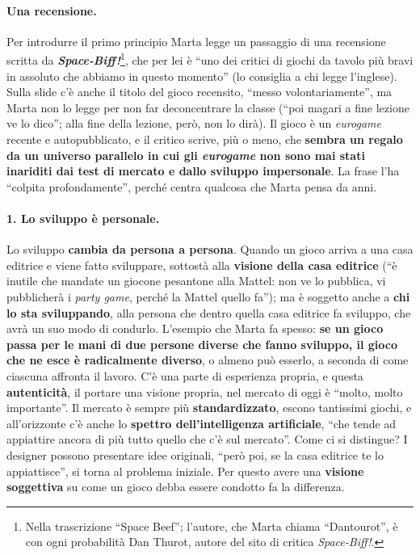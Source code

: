 

\paragraph{Una recensione.} Per introdurre il primo principio Marta legge un passaggio
di una recensione scritta da \textbf{\emph{Space-Biff!}}\footnote{Nella trascrizione
``Space Beef''; l'autore, che Marta chiama ``Dantourot'', è con ogni probabilità Dan
Thurot, autore del sito di critica \emph{Space-Biff!}.}, che per lei è ``uno dei critici
di giochi da tavolo più bravi in assoluto che abbiamo in questo momento'' (lo consiglia a
chi legge l'inglese). Sulla slide c'è anche il titolo del gioco recensito, ``messo
volontariamente'', ma Marta non lo legge per non far deconcentrare la classe (``poi
magari a fine lezione ve lo dico''; alla fine della lezione, però, non lo dirà). Il
gioco è un \emph{eurogame} recente e autopubblicato, e il critico scrive, più o meno,
che \textbf{sembra un regalo da un universo parallelo in cui gli \emph{eurogame} non sono
mai stati inariditi dai test di mercato e dallo sviluppo impersonale}. La frase l'ha
``colpita profondamente'', perché centra qualcosa che Marta pensa da anni.

\paragraph{1. Lo sviluppo è personale.} Lo sviluppo \textbf{cambia da persona a persona}.
Quando un gioco arriva a una casa editrice e viene fatto sviluppare, sottostà alla
\textbf{visione della casa editrice} (``è inutile che mandate un giocone pesantone alla
Mattel: non ve lo pubblica, vi pubblicherà i \emph{party game}, perché la Mattel quello
fa''); ma è soggetto anche a \textbf{chi lo sta sviluppando}, alla persona che dentro
quella casa editrice fa sviluppo, che avrà un suo modo di condurlo. L'esempio che Marta
fa spesso: \textbf{se un gioco passa per le mani di due persone diverse che fanno
sviluppo, il gioco che ne esce è radicalmente diverso}, o almeno può esserlo, a seconda di
come ciascuna affronta il lavoro. C'è una parte di esperienza propria, e questa
\textbf{autenticità}, il portare una visione propria, nel mercato di oggi è ``molto, molto
importante''. Il mercato è sempre più \textbf{standardizzato}, escono tantissimi giochi, e
all'orizzonte c'è anche lo \textbf{spettro dell'intelligenza artificiale}, ``che tende ad
appiattire ancora di più tutto quello che c'è sul mercato''. Come ci si distingue? I
designer possono presentare idee originali, ``però poi, se la casa editrice te lo
appiattisce'', si torna al problema iniziale. Per questo avere una \textbf{visione
soggettiva} su come un gioco debba essere condotto fa la differenza.

